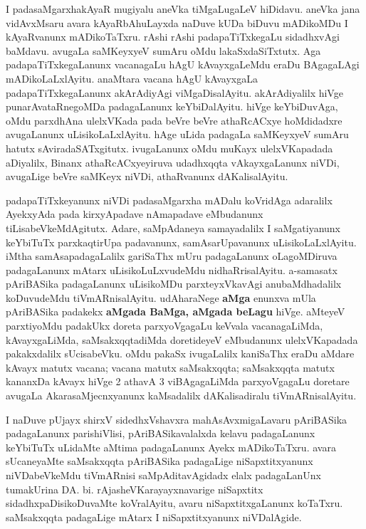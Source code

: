 \medskip

I padasaMgarxhakAyaR mugiyalu aneVka tiMgaLugaLeV hiDidavu. aneVka jana vidAvxMsaru avara kAyaRbAhuLayxda naDuve kUDa biDuvu mADikoMDu I kAyaRvanunx mADikoTaTxru. rAshi rAshi padapaTiTxkegaLu sidadhxvAgi baMdavu. avugaLa saMKeyxyeV sumAru oMdu lakaSxdaSiTxtutx. Aga padapaTiTxkegaLanunx vacanagaLu hAgU kAvayxgaLeMdu eraDu BAgagaLAgi mADikoLaLxlA\-yitu. \hbox{anaMtara} vacana hAgU kAvayxgaLa padapaTiTxkegaLanunx akArAdiyAgi viMgaDisalAyitu. akArAdiyalilx hiVge punarA\-vataRnegoMDa padagaLanunx keYbiDalAyitu. hiVge keYbiDuvAga, oMdu parxdhAna ulelxVKada pada beVre beVre athaRcACxye hoMdidadxre avugaLanunx uLisikoLaLxlAyitu. hAge uLida padagaLa saMKeyxyeV sumAru hatutx sAviradaSATxgitutx. ivugaLanunx oMdu muKayx ulelxVKapadada aDiyalilx, Binanx athaRcACxyeyiruva udadhxqqta vAkayxgaLanunx niVDi, avugaLige beVre saMKeyx niVDi, athaRvanunx dAKalisalAyitu.

\medskip

padapaTiTxkeyanunx niVDi padasaMgarxha mADalu koVridAga adaralilx AyekxyAda pada kirxyApadave nAmapadave eMbudanunx tiLisabeVkeMdAgitutx. Adare, saMpAdaneya samayadalilx I saMgatiyanunx keYbiTuTx parxkaqtirUpa padavanunx, samAsarUpa\-vanunx uLisikoLaLxlAyitu.  iMtha samAsapadagaLalilx gariSaThx mUru padagaLanunx oLagoMDiruva padagaLanunx mAtarx uLisikoLuLxvudeMdu nidhaRrisalAyitu. a-samasatx pAriBASika padagaLanunx uLisikoMDu parxteyxVkavAgi anubaMdhadalilx koDuvudeMdu tiVmARnisa\-lAyitu. udAharaNege \textbf{aMga} enunxva mUla pAriBASika padakekx \textbf{aMgada BaMga, aMgada beLagu} hiVge. aMteyeV parxti\-yoMdu padakUkx doreta parxyoVgagaLu keVvala vacanagaLiMda, kAvayxgaLiMda, saMsakxqqtadiMda doretideyeV eMbudanunx ulelxVKapadada pakakxdalilx sUcisa\-beVku. oMdu pakaSx ivugaLalilx  kaniSaThx eraDu aMdare kAvayx matutx vacana; vacana matutx saMsakxqqta; saMsakxqqta matutx kananxDa kAvayx hiVge 2 athavA 3 viBAgagaLiMda parxyoVgagaLu doretare avugaLa AkarasaMjecnxyanunx kaMsadalilx dAKalisadiralu tiVmARnisalAyitu. 

\newpage

I naDuve pUjayx shirxV sidedhxVshavxra mahAsAvxmigaLavaru pAriBASika padagaLanunx parishiVlisi, pAriBASikavalalxda kelavu padagaLanunx keYbiTuTx uLidaMte aMtima padagaLanunx Ayekx mADikoTaTxru. avara sUcaneyaMte saMsakxqqta pAriBASika padagaLige niSapxtitx\-yanunx niVDa\-beVkeMdu tiVmARnisi saMpAditavAgidadx elalx padagaLanUnx tumakUrina DA. bi. rAjasheVKarayayxnavarige niSapxtitx sidadhxpaDisi\-koDuvaMte koVralAyitu, avaru  niSapxtitxgaLanunx koTaTxru. saMsakxqqta padagaLige mAtarx I niSapxtitxyanunx niVDa\-lAgide. 

